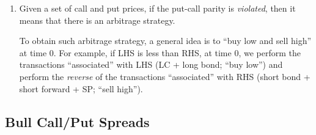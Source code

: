 \begin{enumerate}
\item Given a set of call and put prices, if the put-call parity is
\emph{violated}, then it means that there is an arbitrage strategy.

\begin{note}
To obtain such arbitrage strategy, a general idea is to ``buy low and sell
high'' at time 0. For example, if LHS is less than RHS, at time 0, we perform
the transactions ``associated'' with LHS (LC + long bond; ``buy low'') and
perform the \emph{reverse} of the transactions ``associated'' with RHS (short
bond + short forward + SP; ``sell high'').
\end{note}
\end{enumerate}
\subsection{Bull Call/Put Spreads}
